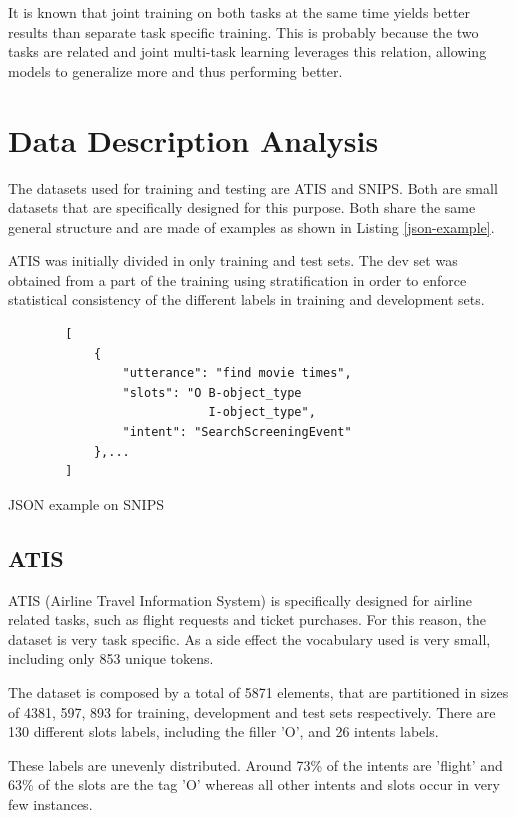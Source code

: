 \documentclass[a4paper]{article}
\begin{document}
\begin{itemize}
\end{itemize}

It is known that joint training on both tasks at the same time yields better results than separate task specific training. This is probably because the two tasks are related and joint multi-task learning leverages this relation, allowing models to generalize more and thus performing better.

\section{Data Description  Analysis}

The datasets used for training and testing are ATIS and SNIPS. Both are small datasets that are specifically designed for this purpose. Both share the same general structure and are made of examples as shown in Listing \ref{json-example}.

ATIS was initially divided in only training and test sets. The dev set was obtained from a part of the training using stratification in order to enforce statistical consistency of the different labels in training and development sets. 
\begin{listing}[h!]
	\begin{verbatim}
		[
			{     
				"utterance": "find movie times",
				"slots": "O B-object_type 
							I-object_type",
				"intent": "SearchScreeningEvent"
			},...
		]
	\end{verbatim}
	\caption{JSON example on SNIPS} 
	\label{json-example}
\end{listing}


\subsection{ATIS}
ATIS (Airline Travel Information System) is specifically designed for airline related tasks, such as flight requests and ticket purchases. For this reason, the dataset is very task specific. As a side effect the vocabulary used is very small, including only 853 unique tokens. 

The dataset is composed by a total of 5871 elements, that are partitioned in sizes of 4381, 597, 893 for training, development and test sets respectively. There are 130 different slots labels, including the filler 'O', and 26 intents labels.  

These labels are unevenly distributed. Around 73\% of the intents are 'flight' and 63\% of the slots are the tag 'O' whereas all other intents and slots occur in very few instances. 
\end{document}
